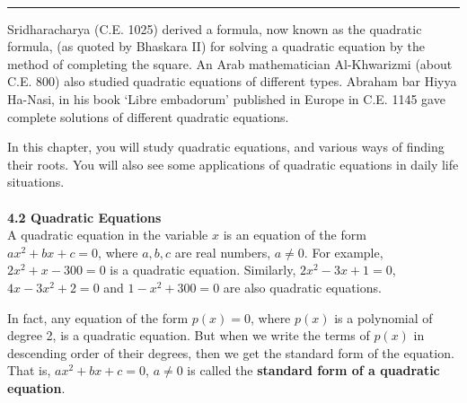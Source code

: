 \documentclass[12pt]{article}
\begin{document}
\pagestyle{empty} %
\thispagestyle{fancy} %
\renewcommand{\headrulewidth}{0pt} %

\vspace*{0.4cm}
\noindent
{\color{cyanblue}\\[-0.6em]
\rule{\textwidth}{3pt}}
\noindent
\smallskip
Sridharacharya (C.E. 1025) derived a formula, now known as the quadratic formula, (as quoted by Bhaskara II) for solving a quadratic equation by the method of completing the square. An Arab mathematician Al-Khwarizmi (about C.E. 800) also studied quadratic equations of different types. Abraham bar Hiyya Ha-Nasi, in his book ‘Libre embadorum’ published in Europe in C.E. 1145 gave complete solutions of different quadratic equations.

\hspace{3em}In this chapter, you will study quadratic equations, and various ways of finding\\ their roots. You will also see some applications of quadratic equations in daily life\\ situations.\\\\
{\color{cyanblue}\bfseries 4.2 \quad Quadratic Equations}\\
\smallskip
A quadratic equation in the variable $x$ is an equation of the form $ax^2 + bx + c = 0$, where $a, b, c$ are real numbers, $a \ne 0$. For example, $2x^2 + x - 300 = 0$ is a quadratic equation. Similarly, $2x^2 - 3x + 1 = 0$, $4x - 3x^2 + 2 = 0$ and $1 - x^2 + 300 = 0$ are also quadratic equations.

\hspace{3em}In fact, any equation of the form $p(x) = 0$, where $p(x)$ is a polynomial of degree 2, is a quadratic equation. But when we write the terms of $p(x)$ in descending order of their degrees, then we get the standard form of the equation. That is, $ax^2 + bx + c = 0$, $a \ne 0$ is called the \textbf{standard form of a quadratic equation}.
\end{document}
